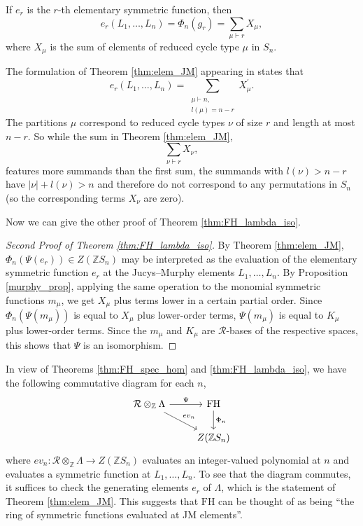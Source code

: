 \documentclass[ALCO,Unicode]{cedram}
\newcommand{\FH}{\mathrm{FH}}
\newcommand{\FH}{\mathrm{FH}}
\begin{document}
\begin{theorem} \label{thm:elem_JM}
If $e_r$ is the $r$-th elementary symmetric function, then
\[
e_r(L_1, \ldots, L_n) = \Phi_n(g_r) = \sum_{\mu \vdash r} X_\mu,
\]
where $X_\mu$ is the sum of elements of reduced cycle type $\mu$ in $S_n$.
\end{theorem}

\begin{remark}
The formulation of Theorem \ref{thm:elem_JM} appearing in \cite[Section 3]{Jucys} states that 
\[
e_r(L_1, \ldots, L_n) = \sum_{\substack{\mu \vdash n, \\ l(\mu) = n-r}} X_\mu^\prime.
\]
The partitions $\mu$ correspond to reduced cycle types $\nu$ of size $r$ and length at most $n-r$. So while the sum in Theorem \ref{thm:elem_JM},
\[
\sum_{\nu \vdash r} X_{\nu},
\]
features more summands than the first sum, the summands with $l(\nu) > n-r$ have $|\nu| + l(\nu) > n$ and therefore do not correspond to any permutations in $S_n$ (so the corresponding terms $X_{\nu}$ are zero).
\end{remark}


Now we can give the other proof of Theorem \ref{thm:FH_lambda_iso}.
\begin{proof}[Second Proof of Theorem \ref{thm:FH_lambda_iso}]
By Theorem \ref{thm:elem_JM}, $\Phi_n(\Psi(e_r)) \in Z(\mathbb{Z}S_n)$ may be interpreted as the evaluation of the elementary symmetric function $e_r$ at the Jucys--Murphy elements $L_1, \ldots, L_n$. By Proposition \ref{murphy_prop}, applying the same operation to the monomial symmetric functions $m_\mu$, we get $X_\mu$ plus terms lower in a certain partial order. Since $\Phi_n(\Psi(m_\mu))$ is equal to $X_\mu$ plus lower-order terms, $\Psi(m_\mu)$ is equal to $K_\mu$ plus lower-order terms. Since the $m_\mu$ and $K_\mu$ are $\mathcal{R}$-bases of the respective spaces, this shows that $\Psi$ is an isomorphism.
\end{proof}

In view of Theorems \ref{thm:FH_spec_hom} and \ref{thm:FH_lambda_iso}, we have the following commutative diagram for each $n$,
\begin{equation}
\begin{tikzcd}
\mathcal{R} \otimes_{\mathbb{Z}} \Lambda    \arrow[r, "\Psi"]    \arrow[dr, "ev_n"]    &    \FH    \arrow[d, "\Phi_n"]\\
&    Z(\mathbb{Z}S_n)
\end{tikzcd}
\end{equation}
where $ev_n: \mathcal{R} \otimes_{\mathbb{Z}} \Lambda \to Z(\mathbb{Z}S_n)$ evaluates an integer-valued polynomial at $n$ and evaluates a symmetric function at $L_1, \ldots, L_n$. To see that the diagram commutes, it suffices to check the generating elements $e_r$ of $\Lambda$, which is the statement of Theorem \ref{thm:elem_JM}. This suggests that $\FH$ can be thought of as being ``the ring of symmetric functions evaluated at JM elements''.
\end{document}
